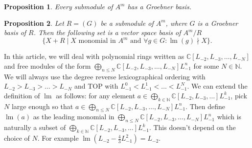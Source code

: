 \documentclass[12pt,a4paper]{article}
\newtheorem{proposition}{Proposition}
\DeclareMathOperator{\lm}{lm}
\begin{document}
\begin{proposition}
  \label{prp:7}
  Every submodule of $A^m$ has a Groebner basis.
\end{proposition}

\begin{proposition}
  \label{prp:8}
  Let $R=(G)$ be a submodule of $A^m$, where $G$ is a Groebner basis of $R$.
  Then the following set is a vector space basis of $A^m/R$
  \begin{equation*}
    \{X+R\mid X \text{ monomial in } A^m\text{ and } \forall g\in G: \lm(g)\nmid X\}.
  \end{equation*}
\end{proposition}
In this article, we will deal with polynomial rings written as $\mathbb{C}[L_{-2},L_{-3},\dots,L_{-N}]$ and free modules of the form $\bigoplus_{n\le N}\mathbb{C}[L_{-2},L_{-3},\dots,L_{-N}]L_{-1}^n$ for some $N\in \mathbb{N}$.
We will always use the degree reverse lexicographical ordering with $L_{-2}>L_{-3}>\dots>L_{-N}$ and TOP with $L_{-1}^0<L_{-1}^1<\dots<L_{-1}^N$.
We can extend the definition of $\lm$ as follows: for any element $a\in \bigoplus_{k\in \mathbb{N}}\mathbb{C}[L_{-2},L_{-3},\dots]L_{-1}^k$, pick $N$ large enough so that $a\in \bigoplus_{n\le N}\mathbb{C}[L_{-2},L_{-3},\dots,L_{-N}]L_{-1}^n$.
Then define $\lm(a)$ as the leading monomial in $\bigoplus_{n\le N}\mathbb{C}[L_{-2},L_{-3},\dots,L_{-N}]L_{-1}^n$ which is naturally a subset of $\bigoplus_{k\in \mathbb{N}}\mathbb{C}[L_{-2},L_{-3},\dots]L_{-1}^k$.
This doesn't depend on the choice of $N$.
For example $\lm(L_{-2}-\frac{4}{3}L_{-1}^2)=L_{-2}$.
\end{document}
